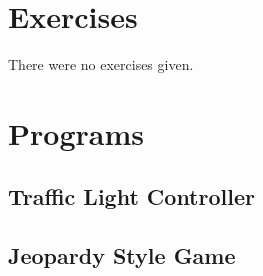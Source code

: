 \documentclass[11pt]{article}
\begin{document}
\section{Exercises}

There were no exercises given.

\clearpage
\section{Programs}

\subsection{Traffic Light Controller}
\begingroup
\fontsize{10pt}{12pt}



\endgroup

\clearpage
\subsection{Jeopardy Style Game}
\begingroup
\fontsize{9pt}{11pt}



\endgroup
\end{document}

